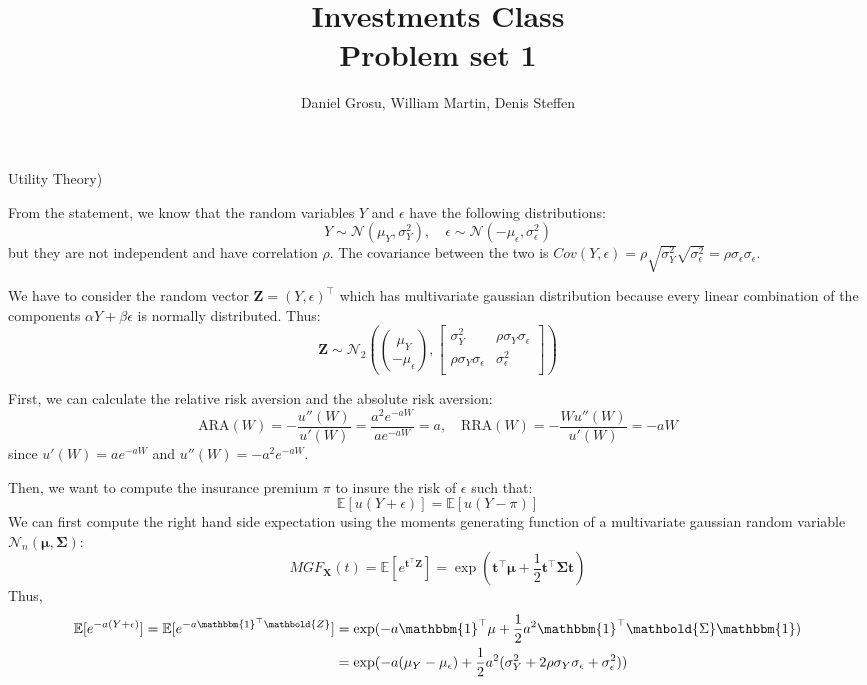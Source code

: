 \documentclass[10pt]{article}
\newcommand{\Ebb}{\mathbb{E}}
\renewcommand{\mathbf}{\mathbold}
\newenvironment{exercise}[2][Exercise]{\begin{trivlist}
  \item[\hskip \labelsep {\bfseries #1}\hskip \labelsep {\bfseries #2.}]}{\end{trivlist}}
\begin{document}
	
  \renewcommand{\qedsymbol}{\smiley}
	\title{Investments Class \\ Problem set 1}
	\author{Daniel Grosu, William Martin, Denis Steffen}
	
	\maketitle

  \begin{exercise}{1}(Utility Theory)

From the statement, we know that the random variables $Y$ and $\epsilon$ have the following distributions:
$$ Y \sim \mathcal{N}(\mu_Y,\sigma_Y^2), \quad \epsilon \sim \mathcal{N}(-\mu_\epsilon,\sigma_\epsilon^2)$$ but they are not independent and have correlation $\rho$. 
The covariance between the two is $Cov(Y,\epsilon) = \rho\sqrt{\sigma_Y^2}\sqrt{\sigma_\epsilon^2} = \rho\sigma_\epsilon\sigma_\epsilon$. 

We have to consider the random vector $\mathbf{Z} = (Y,\epsilon)^\top$ which has multivariate gaussian distribution because every linear combination of the components $\alpha Y + \beta \epsilon$ is normally distributed. Thus:
$$ \mathbf{Z} \sim \mathcal{N}_2 \left( {\mu_Y \choose -\mu_\epsilon},\begin{bmatrix}
  \sigma^2_Y&\rho\sigma_Y\sigma_\epsilon\\
  \rho\sigma_Y\sigma_\epsilon&\sigma_\epsilon^2\\
  \end{bmatrix} \right) $$

  First, we can calculate the relative risk aversion and the absolute risk aversion:
\begin{equation*}
  \text{ARA}(W) = -\frac{u''(W)}{u'(W)} = \frac{a^2e^{-aW}}{ae^{-aW}} = a, \quad \text{RRA}(W) = -\frac{Wu''(W)}{u'(W)} = -aW
\end{equation*} since $u'(W) = ae^{-aW}$ and $u''(W) = -a^2e^{-aW}$.

Then, we want to compute the insurance premium $\pi$ to insure the risk of $\epsilon$ such that: $$ \Ebb[u(Y+\epsilon)] = \Ebb[u(Y-\pi)] $$
We can first compute the right hand side expectation using the moments generating function of a multivariate gaussian random variable $\mathcal{N}_n(\mathbf{\mu},\mathbf{\Sigma}) $:
$$ MGF_\mathbf{X}(t) = \Ebb[e^{\mathbf{t}^\top\mathbf{Z}}] = \exp(\mathbf{t}^\top\mathbf{\mu} + \frac{1}{2}\mathbf{t}^\top\mathbf{\Sigma}\mathbf{t})$$
Thus, 
\begin{align*}
  \Ebb[e^{-a(Y+\epsilon)}] = \Ebb[e^{-a\mathbbm{1}^\top\mathbf{Z}}] &= \exp(-a\mathbbm{1}^\top\mu + \frac{1}{2}a^2\mathbbm{1}^\top\mathbf{\Sigma}\mathbbm{1}) \\
  &= \exp(-a(\mu_Y - \mu_\epsilon)+\frac{1}{2}a^2(\sigma_Y^2 + 2\rho\sigma_Y\sigma_\epsilon + \sigma_\epsilon^2))
\end{align*}


\end{exercise}
\end{document}
